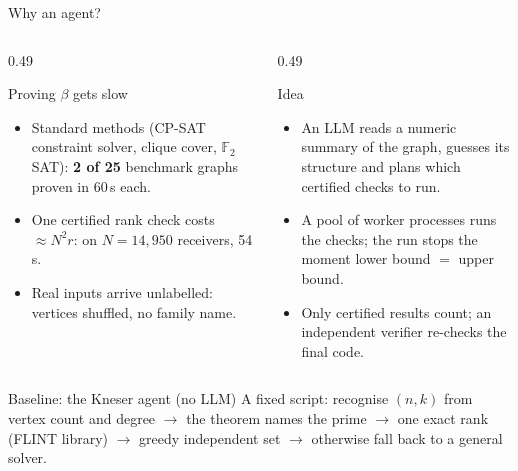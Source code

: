 \documentclass[11pt]{beamer}
\begin{document}
\begin{frame}{Why an agent?}
  \begin{columns}[T]
    \begin{column}{0.49\textwidth}
      \begin{alertblock}{Proving $\beta$ gets slow}
        \footnotesize
        \begin{itemize}
          \item Standard methods (CP-SAT constraint solver, clique cover, $\mathbb{F}_2$ SAT): \textbf{2 of 25} benchmark graphs proven in
                60\,s each.
          \item One certified rank check costs $\approx N^2 r$: on $N = 14{,}950$ receivers, 54\,s.
          \item Real inputs arrive unlabelled: vertices shuffled, no family name.
        \end{itemize}
      \end{alertblock}
    \end{column}
    \begin{column}{0.49\textwidth}
      \begin{block}{Idea}
        \footnotesize
        \begin{itemize}
          \item An LLM reads a numeric summary of the graph, guesses its structure and plans which certified checks
                to run.
          \item A pool of worker processes runs the checks; the run stops the moment lower bound $=$ upper bound.
          \item Only certified results count; an independent verifier re-checks the final code.
        \end{itemize}
      \end{block}
    \end{column}
  \end{columns}
  \vfill
  \begin{block}{Baseline: the Kneser agent (no LLM)}
    \footnotesize A fixed script: recognise $(n,k)$ from vertex count and degree $\to$ the theorem names the prime
    $\to$ one exact rank (FLINT library) $\to$ greedy independent set $\to$ otherwise fall back to a general solver.
  \end{block}
\end{frame}
\end{document}
